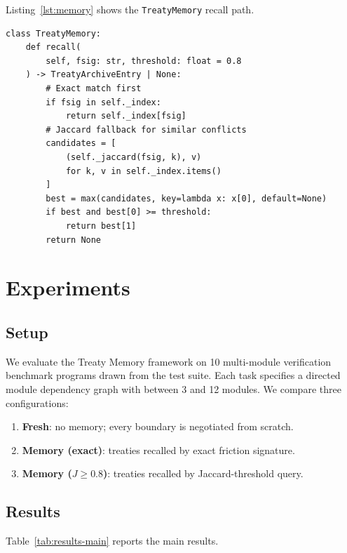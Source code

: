 \documentclass[11pt]{article}
\begin{document}
Listing~\ref{lst:memory} shows the \texttt{TreatyMemory} recall path.

\begin{lstlisting}[style=jugeo-python,caption={Treaty recall with warm-start.},label={lst:memory}]
class TreatyMemory:
    def recall(
        self, fsig: str, threshold: float = 0.8
    ) -> TreatyArchiveEntry | None:
        # Exact match first
        if fsig in self._index:
            return self._index[fsig]
        # Jaccard fallback for similar conflicts
        candidates = [
            (self._jaccard(fsig, k), v)
            for k, v in self._index.items()
        ]
        best = max(candidates, key=lambda x: x[0], default=None)
        if best and best[0] >= threshold:
            return best[1]
        return None
\end{lstlisting}

\section{Experiments}\label{sec:experiments}

\subsection{Setup}

We evaluate the Treaty Memory framework on 10 multi-module
verification benchmark programs drawn from the \JuGeo{} test suite.
Each task specifies a directed module dependency graph with between
3 and 12 modules.  We compare three configurations:
\begin{enumerate}[noitemsep,label=(\alph*)]
  \item \textbf{Fresh}: no memory; every boundary is negotiated from scratch.
  \item \textbf{Memory (exact)}: treaties recalled by exact friction signature.
  \item \textbf{Memory ($J \geq 0.8$)}: treaties recalled by Jaccard-threshold query.
\end{enumerate}

\subsection{Results}

Table~\ref{tab:results-main} reports the main results.
\end{document}
